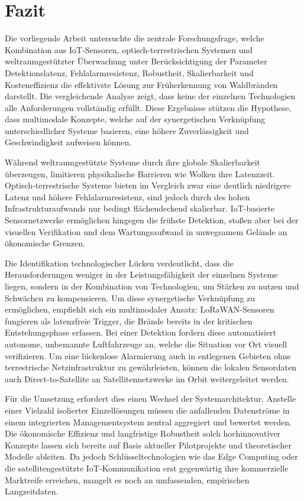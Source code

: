 \chapter{Fazit}\label{ch:fazit}           

Die vorliegende Arbeit untersuchte die zentrale Forschungsfrage, welche Kombination aus \acs{IoT}-Sensoren, optisch-terrestrischen Systemen und weltraumgestützter Überwachung unter Berücksichtigung der Parameter Detektionslatenz, Fehlalarmresistenz, Robustheit, Skalierbarkeit und Kosteneffizienz die effektivste Lösung zur Früherkennung von Waldbränden darstellt.
Die vergleichende Analyse zeigt, dass keine der einzelnen Technologien alle Anforderungen vollständig erfüllt. Diese Ergebnisse stützen die Hypothese, dass multimodale Konzepte, welche auf der synergetischen Verknüpfung unterschiedlicher Systeme basieren, eine höhere Zuverlässigkeit und Geschwindigkeit aufweisen können.

Während weltraumgestützte Systeme durch ihre globale Skalierbarkeit überzeugen, limitieren physikalische Barrieren wie Wolken ihre Latenzzeit. Optisch-terrestrische Systeme bieten im Vergleich zwar eine deutlich niedrigere Latenz und höhere Fehlalarmresistenz, sind jedoch durch des hohen Infrastrukturaufwands nur bedingt flächendeckend skalierbar. \acs{IoT}-basierte Sensornetzwerke ermöglichen hingegen die frühste Detektion, stoßen aber bei der visuellen Verifikation und dem Wartungsaufwand in unwegsamem Gelände an ökonomische Grenzen.

Die Identifikation technologischer Lücken verdeutlicht, dass die Herausforderungen weniger in der Leistungsfähigkeit der einzelnen Systeme liegen, sondern in der Kombination von Technologien, um Stärken zu nutzen und Schwächen zu kompensieren. Um diese synergetische Verknüpfung zu ermöglichen, empfiehlt sich ein multimodaler Ansatz: \acs{LoRaWAN}-Sensoren fungieren als latenzfreie Trigger, die Brände bereits in der kritischen Entstehungsphase erfassen. Bei einer Detektion fordern diese automatisiert autonome, unbemannte Luftfahrzeuge an, welche die Situation vor Ort visuell verifizieren. Um eine lückenlose Alarmierung auch in entlegenen Gebieten ohne terrestrische Netzinfrastruktur zu gewährleisten, können die lokalen Sensordaten auch Direct-to-Satellite an Satellitennetzwerke im Orbit weitergeleitet werden.

Für die Umsetzung erfordert dies einen Wechsel der Systemarchitektur. Anstelle einer Vielzahl isolierter Einzellösungen müssen die anfallenden Datenströme in einem integrierten Managementsystem zentral aggregiert und bewertet werden. Die ökonomische Effizienz und langfristige Robustheit solch hochinnovativer Konzepte lassen sich bereits auf Basis aktueller Pilotprojekte und theoretischer Modelle ableiten. Da jedoch Schlüsseltechnologien wie das Edge Computing oder die satellitengestützte \acs{IoT}-Kommunikation erst gegenwärtig ihre kommerzielle Marktreife erreichen, mangelt es noch an umfassenden, empirischen Langzeitdaten.

